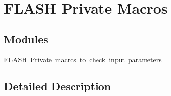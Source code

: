 \hypertarget{group___f_l_a_s_h___private___macros}{}\section{F\+L\+A\+SH Private Macros}
\label{group___f_l_a_s_h___private___macros}
\subsection*{Modules}
\begin{DoxyCompactItemize}
\item 
\mbox{\hyperlink{group___f_l_a_s_h___i_s___f_l_a_s_h___definitions}{F\+L\+A\+S\+H Private macros to check input parameters}}
\end{DoxyCompactItemize}


\subsection{Detailed Description}
